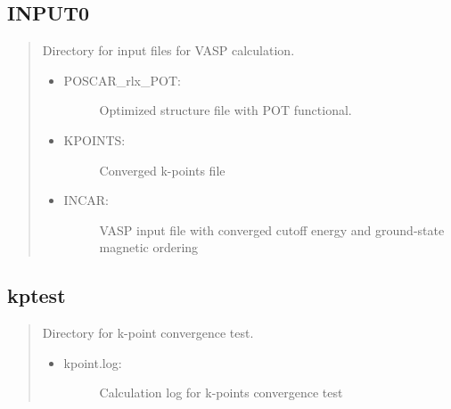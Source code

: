 \documentclass[letterpaper,10pt,english]{sphinxmanual}
\begin{document}
\subsection{INPUT0}
\label{\detokenize{Output/Output:input0}}\begin{quote}

Directory for input files for VASP calculation.
\begin{itemize}
\item {} \begin{description}
\item[{POSCAR\_rlx\_POT:}] \leavevmode
Optimized structure file with POT functional.

\end{description}

\item {} \begin{description}
\item[{KPOINTS:}] \leavevmode
Converged k-points file

\end{description}

\item {} \begin{description}
\item[{INCAR:}] \leavevmode
VASP input file with converged cutoff energy and ground-state magnetic ordering

\end{description}

\end{itemize}
\end{quote}


\subsection{kptest}
\label{\detokenize{Output/Output:kptest}}\begin{quote}

Directory for k-point convergence test.
\begin{itemize}
\item {} \begin{description}
\item[{kpoint.log:}] \leavevmode
Calculation log for k-points convergence test

\end{description}

\end{itemize}
\end{quote}
\end{document}
